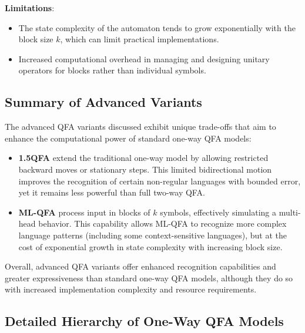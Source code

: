 \textbf{Limitations}: 
\begin{itemize}
    \item The state complexity of the automaton tends to grow exponentially with the block size \( k \), which can limit practical implementations.
    \item Increased computational overhead in managing and designing unitary operators for blocks rather than individual symbols.
\end{itemize}

\subsection*{Summary of Advanced Variants}
The advanced QFA variants discussed exhibit unique trade-offs that aim to enhance the computational power of standard one-way QFA models:
\begin{itemize}
    \item \textbf{1.5QFA} extend the traditional one-way model by allowing restricted backward moves or stationary steps. This limited bidirectional motion improves the recognition of certain non-regular languages with bounded error, yet it remains less powerful than full two-way QFA.
    \item \textbf{ML-QFA} process input in blocks of \( k \) symbols, effectively simulating a multi-head behavior. This capability allows ML-QFA to recognize more complex language patterns (including some context-sensitive languages), but at the cost of exponential growth in state complexity with increasing block size.
\end{itemize}
Overall, advanced QFA variants offer enhanced recognition capabilities and greater expressiveness than standard one-way QFA models, although they do so with increased implementation complexity and resource requirements.


\subsection*{Detailed Hierarchy of One-Way QFA Models}
\label{subsec:hierarchy-diagram}

